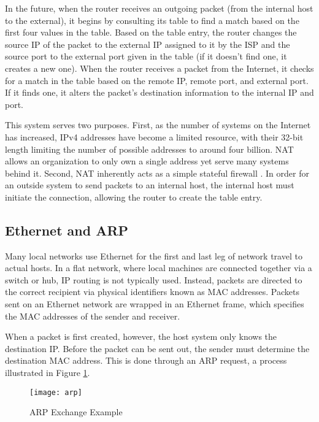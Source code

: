 \par In the future, when the router receives an outgoing packet (from the internal host to the external), it begins by consulting its table to find a match based on the first four values in the table. Based on the table entry, the router changes the source \ac{IP} of the packet to the external IP assigned to it by the \ac{ISP} and the source port to the external port given in the table (if it doesn't find one, it creates a new one). When the router receives a packet from the Internet, it checks for a match in the table based on the remote IP, remote port, and external port. If it finds one, it alters the packet's destination information to the internal IP and port.

\par This system serves two purposes. First, as the number of systems on the Internet has increased, \ac{IPv4} addresses have become a limited resource, with their 32-bit length limiting the number of possible addresses to around four billion. \ac{NAT} allows an organization to only own a single address yet serve many systems behind it. Second, \ac{NAT} inherently acts as a simple stateful firewall \cite{DynAddrMalProp}. In order for an outside system to send packets to an internal host, the internal host must initiate the connection, allowing the router to create the table entry.

\subsection{Ethernet and \acf{ARP}}
\label{sec:eth_routing}
\par Many local networks use Ethernet for the first and last leg of network travel to actual hosts. In a flat network, where local machines are connected together via a switch or hub, \ac{IP} routing is not typically used. Instead, packets are directed to the correct recipient via physical identifiers known as \ac{MAC} addresses. Packets sent on an Ethernet network are wrapped in an Ethernet frame, which specifies the \ac{MAC} addresses of the sender and receiver.

\par When a packet is first created, however, the host system only knows the destination \ac{IP}. Before the packet can be sent out, the sender must determine the destination \ac{MAC} address. This is done through an \ac{ARP} request, a process illustrated in Figure \ref{fig:arp_example}.

\begin{figure}[ht]
\caption{\ac{ARP} Exchange Example}
\label{fig:arp_example}
\centering
\texttt{[image: arp]}
\end{figure}

